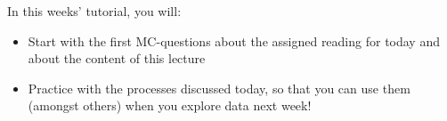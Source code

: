 \documentclass[handout]{beamer}
\begin{document}
\begin{frame}
	
In this weeks' tutorial, you will:
\begin{itemize}
	\item Start with the first MC-questions about the assigned reading for today and about the content of this lecture
	\item Practice with the processes discussed today, so that you can use them (amongst others) when you explore data next week!
\end{itemize}
	
\end{frame}
\end{document}
